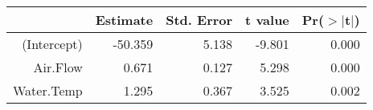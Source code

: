 \begin{table}[ht]
\centering
\begin{tabular}{rrrrr}
  \hline
 & Estimate & Std. Error & t value & Pr($>$$|$t$|$) \\ 
  \hline
(Intercept) & -50.359 & 5.138 & -9.801 & 0.000 \\ 
  Air.Flow & 0.671 & 0.127 & 5.298 & 0.000 \\ 
  Water.Temp & 1.295 & 0.367 & 3.525 & 0.002 \\ 
   \hline
\end{tabular}
\end{table}
